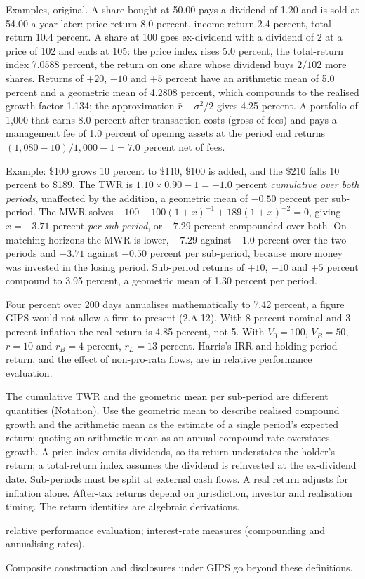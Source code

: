 \begin{qfdefinition}
 Examples, original. A share bought at 50.00 pays a dividend of 1.20 and is sold at 54.00 a year later: price return 8.0 percent, income return 2.4 percent, total return 10.4 percent. A share at 100 goes ex-dividend with a dividend of 2 at a price of 102 and ends at 105: the price index rises 5.0 percent, the total-return index 7.0588 percent, the return on one share whose dividend buys $2/102$ more shares. Returns of $+20$, $-10$ and $+5$ percent have an arithmetic mean of 5.0 percent and a geometric mean of 4.2808 percent, which compounds to the realised growth factor 1.134; the approximation $\bar r-\sigma^2/2$ gives 4.25 percent. A portfolio of 1{,}000 that earns 8.0 percent after transaction costs (gross of fees) and pays a management fee of 1.0 percent of opening assets at the period end returns $(1{,}080-10)/1{,}000-1=7.0$ percent net of fees.

Example: \$100 grows 10 percent to \$110, \$100 is added, and the \$210 falls 10 percent to \$189. The TWR is $1.10\times0.90-1=-1.0$ percent \emph{cumulative over both periods}, unaffected by the addition, a geometric mean of $-0.50$ percent per sub-period. The MWR solves $-100-100(1+x)^{-1}+189(1+x)^{-2}=0$, giving $x=-3.71$ percent \emph{per sub-period}, or $-7.29$ percent compounded over both. On matching horizons the MWR is lower, $-7.29$ against $-1.0$ percent over the two periods and $-3.71$ against $-0.50$ percent per sub-period, because more money was invested in the losing period. Sub-period returns of $+10$, $-10$ and $+5$ percent compound to 3.95 percent, a geometric mean of 1.30 percent per period.

Four percent over 200 days annualises mathematically to 7.42 percent, a figure GIPS would not allow a firm to present (2.A.12). With 8 percent nominal and 3 percent inflation the real return is 4.85 percent, not 5. With $V_0=100$, $V_B=50$, $r=10$ and $r_B=4$ percent, $r_L=13$ percent. Harris's IRR and holding-period return, and the effect of non-pro-rata flows, are in \hyperref[meth:relative-performance-evaluation]{relative performance evaluation}.

 The cumulative TWR and the geometric mean per sub-period are different quantities (Notation). Use the geometric mean to describe realised compound growth and the arithmetic mean as the estimate of a single period's expected return; quoting an arithmetic mean as an annual compound rate overstates growth. A price index omits dividends, so its return understates the holder's return; a total-return index assumes the dividend is reinvested at the ex-dividend date. Sub-periods must be split at external cash flows. A real return adjusts for inflation alone. After-tax returns depend on jurisdiction, investor and realisation timing. The return identities are algebraic derivations.

 \hyperref[meth:relative-performance-evaluation]{relative performance evaluation}; \hyperref[def:interest-rate-measures]{interest-rate measures} (compounding and annualising rates).

 Composite construction and disclosures under GIPS go beyond these definitions.

\end{qfdefinition}
